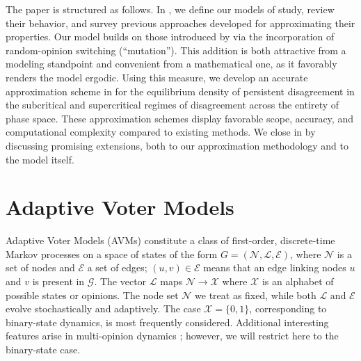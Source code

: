 \documentclass[review, onefignum, onetabnum]{siamart171218}
\begin{document}
	The paper is structured as follows. 
	In , we define our models of study, review their behavior, and survey previous approaches developed for approximating their properties. 
	Our model builds on those introduced by \cite{Holme2006, Durrett2012} via the incorporation of random-opinion switching (``mutation''). 
	This addition is both attractive from a modeling standpoint and convenient from a mathematical one, as it favorably renders the model ergodic. 
	Using this measure, we develop an accurate approximation scheme in  for the equilibrium density of persistent disagreement in the subcritical and supercritical regimes of disagreement across the entirety of phase space.
	These approximation schemes display favorable scope, accuracy, and computational complexity compared to existing methods.
	We close in  by discussing promising extensions, both to our approximation methodology and to the model itself. 
	
\section{Adaptive Voter Models} \label{sec:AVMs}
	
	Adaptive Voter Models (AVMs) constitute a class of first-order, discrete-time Markov processes on a space of states of the form $G = (\mathcal{N}, \mathcal{L}, \mathcal{E})$, where $\mathcal{N}$ is a set of nodes and $\mathcal{E}$ a set of edges; $(u,v) \in \mathcal{E}$ means that an edge linking nodes $u$ and $v$ is present in $\mathcal{G}$.
    The vector $\mathcal{L}$ maps $\mathcal{N} \rightarrow \mathcal{X}$ where $\mathcal{X}$ is an alphabet of possible states or opinions. 
	The node set $\mathcal{N}$ we treat as fixed, while both $\mathcal{L}$ and $\mathcal{E}$ evolve stochastically and adaptively.
	The case $\mathcal{X} = \{0,1\}$, corresponding to binary-state dynamics, is most frequently considered. 
	Additional interesting features arise in multi-opinion dynamics \cite{Holme2006, Shi2013}; however, we will restrict here to the binary-state case. 
	
\end{document}
